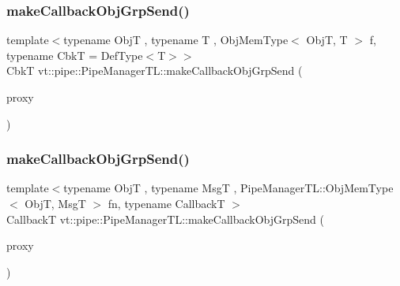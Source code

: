 \subsubsection{\texorpdfstring{make\+Callback\+Obj\+Grp\+Send()}{makeCallbackObjGrpSend()}\hspace{0.1cm}{\footnotesize\ttfamily [1/2]}}
{\footnotesize\ttfamily template$<$typename ObjT , typename T , Obj\+Mem\+Type$<$ Obj\+T, T $>$ f, typename CbkT  = Def\+Type$<$\+T$>$$>$ \\
CbkT vt\+::pipe\+::\+Pipe\+Manager\+T\+L\+::make\+Callback\+Obj\+Grp\+Send (\begin{DoxyParamCaption}\item[{\hyperlink{structvt_1_1objgroup_1_1proxy_1_1_proxy_elm}{objgroup\+::proxy\+::\+Proxy\+Elm}$<$ ObjT $>$}]{proxy }\end{DoxyParamCaption})}

\mbox{\label{structvt_1_1pipe_1_1_pipe_manager_t_l_a304681fe59bec2e1ad28a357f48aeab3}} 
\subsubsection{\texorpdfstring{make\+Callback\+Obj\+Grp\+Send()}{makeCallbackObjGrpSend()}\hspace{0.1cm}{\footnotesize\ttfamily [2/2]}}
{\footnotesize\ttfamily template$<$typename ObjT , typename MsgT , Pipe\+Manager\+T\+L\+::\+Obj\+Mem\+Type$<$ Obj\+T, Msg\+T $>$ fn, typename CallbackT $>$ \\
CallbackT vt\+::pipe\+::\+Pipe\+Manager\+T\+L\+::make\+Callback\+Obj\+Grp\+Send (\begin{DoxyParamCaption}\item[{\hyperlink{structvt_1_1objgroup_1_1proxy_1_1_proxy_elm}{objgroup\+::proxy\+::\+Proxy\+Elm}$<$ ObjT $>$}]{proxy }\end{DoxyParamCaption})}

\mbox{\label{structvt_1_1pipe_1_1_pipe_manager_t_l_ad3ee09b4e7976de176b14d76d70b2bdb}} 

